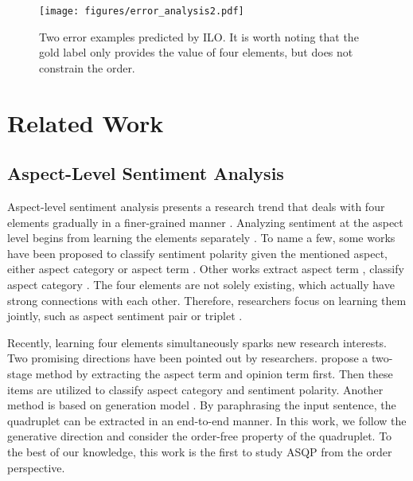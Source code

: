 \documentclass[11pt]{article}
\begin{document}
\begin{figure}[t]
\centering
\texttt{[image: figures/error\_analysis2.pdf]} 
\caption{Two error examples predicted by ILO. It is worth noting that the gold label only provides the value of four elements, but does not constrain the order.}
\label{fig:figure_error}
\end{figure}


\section{Related Work}
\subsection{Aspect-Level Sentiment Analysis}
Aspect-level sentiment analysis presents a research trend that deals with four elements gradually in a finer-grained manner \cite{zhang2022survey}. Analyzing sentiment at the aspect level begins from learning the elements separately \cite{pontiki-etal-2014-semeval}. To name a few, some works have been proposed to classify sentiment polarity given the mentioned aspect, either aspect category \cite{hu-etal-2019-constrained} or aspect term \cite{zhang2020convolution}. Other works extract aspect term \cite{ma-etal-2019-exploring}, classify aspect category \cite{bu-etal-2021-asap}. The four elements are not solely existing, which actually have strong connections with each other. Therefore, researchers focus on learning them jointly, such as aspect sentiment pair \cite{zhao-etal-2020-spanmlt,cai2020aspect} or triplet \cite{chen-qian-2020-relation,mao2021joint}. 

Recently, learning four elements simultaneously sparks new research interests. Two promising directions have been pointed out by researchers. \citet{cai2021aspect} propose a two-stage method by extracting the aspect term and opinion term first. Then these items are utilized to classify aspect category and sentiment polarity. Another method is based on generation model \cite{zhang-etal-2021-aspect-sentiment}. By paraphrasing the input sentence, the quadruplet can be extracted in an end-to-end manner. In this work, we follow the generative direction and consider the order-free property of the quadruplet. To the best of our knowledge, this work is the first to study ASQP from the order perspective.
\end{document}
